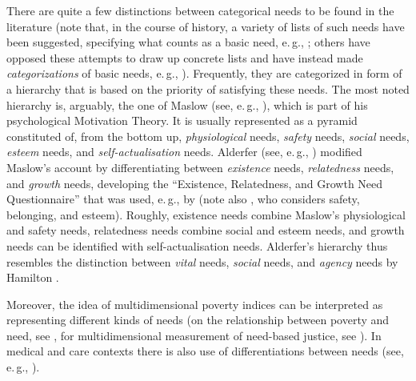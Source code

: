\documentclass[10pt,letterpaper]{article}
\begin{document}
There are quite a few distinctions between categorical needs to be found in the literature (note that, in the course of history, a variety of lists of such needs have been suggested, specifying what counts as a basic need, e.\,g., \cite{doyal_theory_1991,braybrooke_meeting_1987,nussbaum_aristotelian_1990}; others have opposed these attempts to draw up concrete lists and have instead made \textit{categorizations} of basic needs, e.\,g., \cite{hamilton_political_2003}).
Frequently, they are categorized in form of a hierarchy that is based on the priority of satisfying these needs.
The most noted hierarchy is, arguably, the one of Maslow (see, e.\,g., \cite{maslow_theory_1943}), which is part of his psychological Motivation Theory.
It is usually represented as a pyramid constituted of, from the bottom up, \textit{physiological} needs, \textit{safety} needs, \textit{social} needs, \textit{esteem} needs, and \textit{self-actualisation} needs.
Alderfer (see, e.\,g., \cite{alderfer_empirical_1969,alderfer_existence_1972}) modified Maslow's account by differentiating between \textit{existence} needs, \textit{relatedness} needs, and \textit{growth} needs, developing the ``Existence, Relatedness, and Growth Need Questionnaire'' that was used, e.\,g., by \cite{rauschenberger_test_1980} (note also \cite{williams_multi-dimensional_1989}, who considers safety, belonging, and esteem).
Roughly, existence needs combine Maslow's physiological and safety needs, relatedness needs combine social and esteem needs, and growth needs can be identified with self-actualisation needs.
Alderfer's hierarchy thus resembles the distinction between \textit{vital} needs, \textit{social} needs, and \textit{agency} needs by Hamilton \cite{hamilton_political_2003,de_bruin_human_2009}.

Moreover, the idea of multidimensional poverty indices can be interpreted as representing different kinds of needs (on the relationship between poverty and need, see \cite{carthaigh_need_2014}, for multidimensional measurement of need-based justice, see \cite{bauer_sated_2018,bauer_sated_2022}).
In medical and care contexts there is also use of differentiations between needs (see, e.\,g., \cite{hornquist_concept_1982,cleary_patient_2006,vlachantoni_measuring_2011,glorney_domains_2010}).
\end{document}

